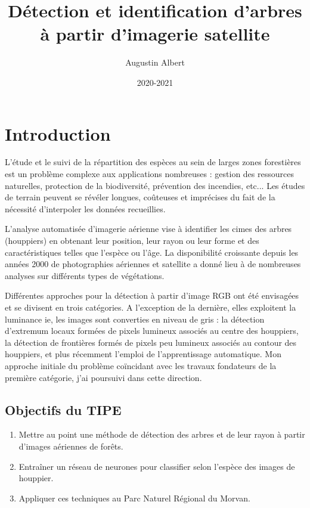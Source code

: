 \documentclass{article}
\title{Détection et identification d'arbres à partir d'imagerie satellite}
\author{Augustin Albert}
\date{2020-2021}
\begin{document}

\maketitle
\tableofcontents
\newpage 

\section*{Introduction}

L'étude et le suivi de la répartition des espèces au sein de larges zones forestières est un problème complexe aux applications nombreuses :
gestion des ressources naturelles, protection de la biodiversité, prévention des incendies, etc... Les études de terrain peuvent se révéler longues, coûteuses et imprécises du fait de la nécessité d'interpoler les données recueillies. 

L'analyse automatisée d'imagerie aérienne vise à identifier les cimes des arbres (houppiers) en obtenant leur position, leur rayon ou leur forme et des caractéristiques telles que l'espèce ou l'âge. La disponibilité croissante depuis les années 2000 de photographies aériennes et satellite a donné lieu à de nombreuses analyses sur différents types de végétations.

Différentes approches pour la détection à partir d'image RGB ont été envisagées et se divisent en trois catégories. A l'exception de la dernière, elles exploitent la luminance ie, les images sont converties en niveau de gris : la détection d'extremum locaux formées de pixels lumineux associés au centre des houppiers, la détection de frontières formés de pixels peu lumineux associés au contour des houppiers, et plus récemment l'emploi de l'apprentissage automatique. Mon approche initiale du problème coïncidant avec les travaux fondateurs de la première catégorie, j'ai poursuivi dans cette direction. 

\subsection*{Objectifs du TIPE}		
\begin{enumerate}
	\item Mettre au point une méthode de détection des arbres et de leur rayon à partir d'images aériennes de forêts.  
    \item Entraîner un réseau de neurones pour classifier selon l'espèce des images de houppier.
	\item Appliquer ces techniques au Parc Naturel Régional du Morvan.   
\end{enumerate}
	
\end{document}
